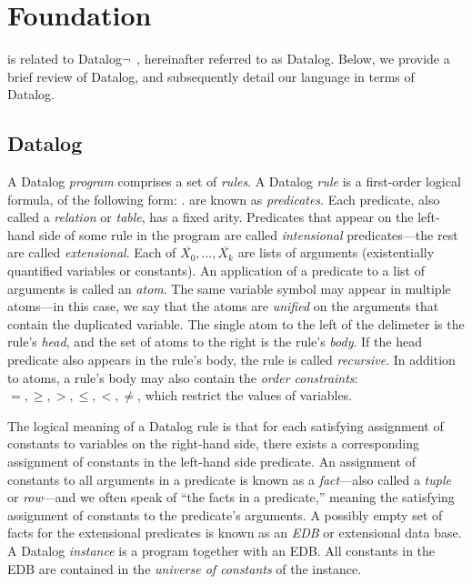 \section{Foundation}
\label{sec:lang}

\lang is related to Datalog$\lnot$~\cite{ullmanbook}, hereinafter referred to
as Datalog.
Below, we provide a brief review of Datalog, and subsequently detail our
language in terms of Datalog.

\subsection{Datalog}
\label{sec:datalog}

A Datalog {\em program} comprises a set of {\em rules}.  A Datalog {\em rule}
is a first-order logical formula, of the following form:
.   are known as {\em
predicates}.  Each predicate, also called a {\em relation} or {\em table}, has
a fixed arity.  Predicates that appear on the left-hand side of some rule in
the program are called {\em intensional} predicates---the rest are called {\em
extensional}.  Each of $\overline{X_0}, ..., \overline{X_k}$ are lists of
arguments (existentially quantified variables or constants).  An application of
a predicate to a list of arguments is called an {\em atom}.  The same variable
symbol may appear in multiple atoms---in this case, we say that the atoms
are {\em unified} on the arguments that contain the duplicated variable.  The
single atom to the left of the \dedalus{:-} delimeter is the rule's {\em head},
and the set of atoms to the right is the rule's {\em body}.  If the head
predicate also appears in the rule's body, the rule is called {\em recursive}.
In addition to atoms, a rule's body may also contain the {\em order
constraints}: $=, \geq, >, \leq, <, \neq$, which restrict the values of
variables.  

The logical meaning of a Datalog rule is that for each satisfying assignment of
constants to variables on the right-hand side, there exists
a corresponding
assignment of constants in the left-hand side predicate.  An assignment of
constants to all arguments in a predicate is known as a {\em fact}---also
called a {\em tuple} or {\em row}---and we often speak of ``the facts in a
predicate,'' meaning the satisfying assignment of constants to the predicate's
arguments.  A possibly empty set of facts for the extensional predicates is
known as an {\em EDB} or extensional data base.  A Datalog {\em instance} is a
program together with an EDB.  All constants in the EDB are contained in the
{\em universe of constants} of the instance.

